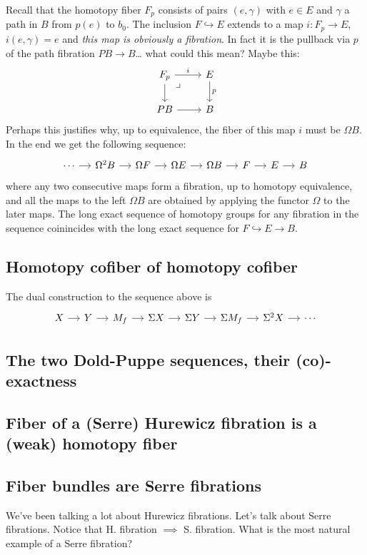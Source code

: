 \begin{remark}
\begin{defn}
Recall that the homotopy fiber $F_p$ consists of pairs $(e,\gamma)$ with $e\in E$ and $\gamma$ a path in $B$ from $p(e)$ to $b_0$. The inclusion $F\hookrightarrow E$ extends to a map $i:F_{p}\to E$, $i(e,\gamma)=e$ and \textit{this map is obviously a fibration}. In fact it is the pullback via $p$ of the path fibration $PB\to B$… {\color{blue}what could this mean? Maybe this:}
\[\begin{tikzcd}
	F_{p}\arrow[r,"i"]\arrow[d]\arrow[dr,phantom,very near start,"\lrcorner"]&E\arrow[d,"p"]\\
	PB\arrow[r]&B
\end{tikzcd}\]
Perhaps this justifies why, up to equivalence, the fiber of this map $i$ must be $\Omega B$. In the end we get the following sequence:
\[\begin{tikzcd}[column sep=small]
	\cdots\arrow[r]&\Omega^{2}B\arrow[r]&\Omega F\arrow[r]&\Omega E\arrow[r]&\Omega B\arrow[r]&F\arrow[r]&E\arrow[r]&B
\end{tikzcd}\]
where any two consecutive maps form a fibration, up to homotopy equivalence, and all the maps to the left $\Omega B$ are obtained by applying the functor $\Omega$ to the later maps. The long exact sequence of homotopy groups for any fibration in the sequence coinincides with the long exact sequence for $F\hookrightarrow E\to B$.

\subsection{Homotopy cofiber of homotopy cofiber}

The dual construction to the sequence above is
\[\begin{tikzcd}[column sep=small]
	X\arrow[r]&Y\arrow[r]&M_{f}\arrow[r]&\Sigma X\arrow[r]&\Sigma Y\arrow[r]&\Sigma M_{f}\arrow[r]&\Sigma^{2}X\arrow[r]&\cdots 
\end{tikzcd}\]

\subsection{The two Dold-Puppe sequences, their (co)-exactness}

\subsection{Fiber of a (Serre) Hurewicz fibration is a (weak) homotopy fiber}

\subsection{Fiber bundles are Serre fibrations}
We've been talking a lot about Hurewicz fibrations. Let's talk about Serre fibrations. Notice that H. fibration $\implies$ S. fibration. What is the most natural example of a Serre fibration?


\end{defn}
\end{remark}

